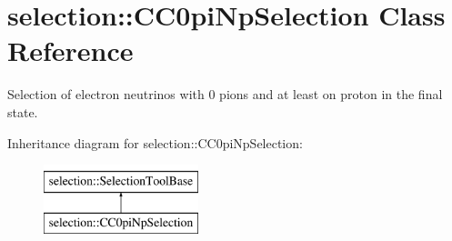 \hypertarget{classselection_1_1CC0piNpSelection}{\section{selection\-:\-:C\-C0pi\-Np\-Selection Class Reference}
\label{classselection_1_1CC0piNpSelection}
}


Selection of electron neutrinos with 0 pions and at least on proton in the final state.  


Inheritance diagram for selection\-:\-:C\-C0pi\-Np\-Selection\-:\begin{figure}[H]
\begin{center}
\leavevmode
\includegraphics[height=2.000000cm]{classselection_1_1CC0piNpSelection}
\end{center}
\end{figure}
